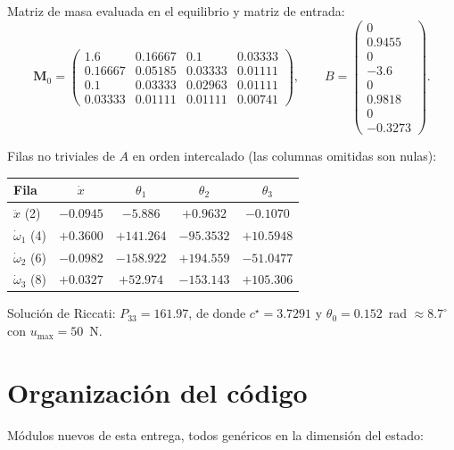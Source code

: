 \documentclass[11pt,letterpaper]{article}
\theoremstyle{definition}
\theoremstyle{plain}
\theoremstyle{remark}
\newcommand{\Mm}{\bm{M}}
\begin{document}
Matriz de masa evaluada en el equilibrio y matriz de entrada:
\[
\Mm_0=\begin{pmatrix}
1.6 & 0.16667 & 0.1 & 0.03333\\
0.16667 & 0.05185 & 0.03333 & 0.01111\\
0.1 & 0.03333 & 0.02963 & 0.01111\\
0.03333 & 0.01111 & 0.01111 & 0.00741
\end{pmatrix},
\qquad
B=\begin{pmatrix}0\\ 0.9455\\ 0\\ -3.6\\ 0\\ 0.9818\\ 0\\ -0.3273\end{pmatrix}.
\]

Filas no triviales de $A$ en orden intercalado (las columnas omitidas son nulas):

\begin{table}[htbp]
  \centering\small
  \begin{tabular}{@{}lcccc@{}}
    \toprule
    \textbf{Fila} & $\dot x$ & $\theta_1$ & $\theta_2$ & $\theta_3$\\
    \midrule
    $\ddot x$ (2) & $-0.0945$ & $-5.886$ & $+0.9632$ & $-0.1070$\\
    $\dot\omega_1$ (4) & $+0.3600$ & $+141.264$ & $-95.3532$ & $+10.5948$\\
    $\dot\omega_2$ (6) & $-0.0982$ & $-158.922$ & $+194.559$ & $-51.0477$\\
    $\dot\omega_3$ (8) & $+0.0327$ & $+52.974$ & $-153.143$ & $+105.306$\\
    \bottomrule
  \end{tabular}
\end{table}

Solución de Riccati: $P_{33}=161.97$, de donde $c^\star=3.7291$ y
$\theta_0=0.152$~rad $\approx8.7^\circ$ con $u_{\max}=50$~N.

\section{Organización del código}
\label{ap:codigo}

Módulos nuevos de esta entrega, todos genéricos en la dimensión del estado:
\end{document}
